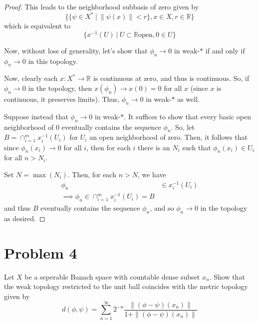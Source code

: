 \documentclass[fontsize=11pt]{scrartcl} %
\numberwithin{equation}{section} %
\numberwithin{figure}{section} %
\numberwithin{table}{section} %
\newcommand{\R}{\mathbb{R}}
\begin{document}
\begin{proof}
    This leads to the neighborhood subbasis of zero given by
    \[
        \{\{\psi\in X^*\ |\ \|\psi(x)\|<r\}, x\in X, r\in \R\}
    \]
    which is equivalent to 
    \[
        \{x^{-1}(U)\ |\ U\subset \R \text{open}, 0\in U\}
    \]

    Now, without loss of generality, let's show that $\phi_n\to 0$ in weak-$*$ if and
    only if $\phi_n\to 0$ in this topology.

    Now, clearly each $x: X^*\to \R$ is continuous at zero, and thus is
    continuous. So, if $\phi_n\to 0$ in the topology, then $x(\phi_n)\to x(0)=0$
    for all $x$ (since $x$ is continuous, it preserves limits). Thus, $\phi_n\to
    0$ in weak-$*$ as well.

    Suppose instead that $\phi_n\to 0$ in weak-$*$. It suffices to show that
    every basic open neighborhood of $0$ eventually contains the sequence
    $\phi_n$. So, let $B = \cap_{i=1}^m x_i^{-1}(U_i)$ for $U_i$ an open
    neighborhood of zero. Then, it follows that since $\phi_n(x_i)\to 0$ for all
    $i$, then for each $i$ there is an $N_i$ such that $\phi_n(x_i)\in U_i$ for
    all $n>N_i$.

    Set $N = \max(N_i)$. Then, for each $n>N$, we have
    \[
        \begin{aligned}
            \phi_n&\in x_i^{-1}(U_i)\\
            \implies \phi_n\in \cap_{i=1}^m x_i^{-1}(U_i) = B
        \end{aligned}
    \]
    and thus $B$ eventually contains the sequence $\phi_n$, and so $\phi_n\to 0$
    in the topology as desired.
\end{proof}

\newpage
\section*{Problem 4}
Let $X$ be a seperable Banach space with countable dense subset $x_n$. Show that
the weak topology restricted to the unit ball coincides with the metric topology
given by 
\[
    d(\phi,\psi) =
    \sum_{n=1}^{\infty}2^{-n}\frac{\|(\phi-\psi)(x_n)\|}{1+\|(\phi-\psi)(x_n)\|}
\]
\end{document}
